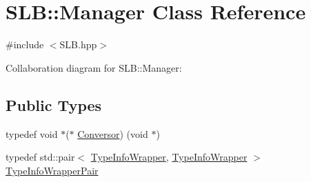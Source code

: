\hypertarget{classSLB_1_1Manager}{}\section{S\+LB\+:\+:Manager Class Reference}
\label{classSLB_1_1Manager}


{\ttfamily \#include $<$S\+L\+B.\+hpp$>$}



Collaboration diagram for S\+LB\+:\+:Manager\+:
\subsection*{Public Types}
\begin{DoxyCompactItemize}
\item 
typedef void $\ast$($\ast$ \hyperlink{classSLB_1_1Manager_ace7ae7e8febfd03b7a43ac5b24dabdff}{Conversor}) (void $\ast$)
\item 
typedef std\+::pair$<$ \hyperlink{classSLB_1_1TypeInfoWrapper}{Type\+Info\+Wrapper}, \hyperlink{classSLB_1_1TypeInfoWrapper}{Type\+Info\+Wrapper} $>$ \hyperlink{classSLB_1_1Manager_abd34d2a3a61f567f11744e9b398debd3}{Type\+Info\+Wrapper\+Pair}
\end{DoxyCompactItemize}
